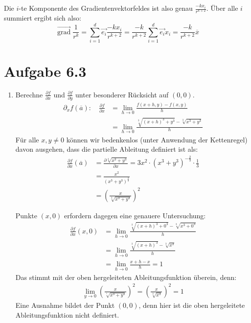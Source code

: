 \documentclass[a4paper,german,12pt,smallheadings]{scrartcl}
\begin{document}
Die $i$-te Komponente des Gradientenvektorfeldes ist also genau $\frac{-k x_i}{r^{k+2}}$.
Über alle $i$ summiert ergibt sich also:
\begin{equation*}
\vec{\operatorname{grad}} \frac{1}{r^k} = \sum_{i=1}^{d}\vec{e_i} \frac{-k x_i}{r^{k+2}}=\frac{-k}{r^{k+2}}\sum_{i=1}^{d}\vec{e_i}x_i=\frac{-k}{r^{k+2}}\overline{x}
\end{equation*}

\section*{Aufgabe 6.3}

\begin{enumerate}[(1)]

\item
Berechne $\frac{\partial f}{\partial x}$ und $\frac{\partial f}{\partial y}$ unter besonderer Rücksicht auf $(0,0)$.
\begin{align*}
\partial_xf(\overline{a}): \quad \frac{\partial f}{\partial x}&=\lim\limits_{h\to 0}\frac{f(x+h,y)-f(x,y)}{h}\\
&=\lim\limits_{h\to 0}\frac{\sqrt[3]{(x+h)^3+y^3}-\sqrt[3]{x^3+y^3}}{h}
\end{align*}
Für alle $x,y\neq 0$ können wir bedenkenlos (unter Anwendung der Kettenregel) davon ausgehen, dass die partielle Ableitung definiert ist als:
\begin{align*}
\frac{\partial f}{\partial x}(\overline{a})&=\frac{\partial \sqrt[3]{x^3+y^3}}{\partial x}=3x^2\cdot\left(x^3+y^3\right)^{-\frac{2}{3}}\cdot \frac{1}{3}\\
&=\frac{x^2}{(x^3+y^3)^{\frac{2}{3}}}\\
&=\left(\frac{x}{\sqrt[3]{x^3+y^3}}\right)^2
\end{align*}

Punkte $(x,0)$ erfordern dagegen eine genauere Untersuchung:
\begin{align*}
\frac{\partial f}{\partial x}(x,0)&=\lim\limits_{h\to 0}\frac{\sqrt[3]{(x+h)^3+0^3}-\sqrt[3]{x^3+0^3}}{h}\\
&=\lim\limits_{h\to 0}\frac{\sqrt[3]{(x+h)^3}-\sqrt[3]{x^3}}{h}\\
&=\lim\limits_{h\to 0}\frac{x+h-x}{h}=1
\end{align*}
Das stimmt mit der oben hergeleiteten Ableitungsfunktion überein, denn:
\begin{align*}
\lim\limits_{y\to 0}\left(\frac{x}{\sqrt[^3]{x^3+y^3}}\right)^2=\left(\frac{x}{\sqrt[3]{x^3}}\right)^2=1
\end{align*}
Eine Ausnahme bildet der Punkt $(0,0)$, denn hier ist die oben hergeleitete Ableitungsfunktion nicht definiert.\\


\end{enumerate}
\end{document}
